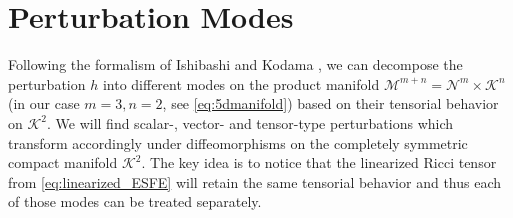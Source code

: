 \documentclass[11pt,aip,jmp,amsmath,amssymb,draft]{revtex4-1}
\begin{document}
\section{\label{sec:modes}Perturbation Modes}
Following the formalism of Ishibashi and Kodama \cite{ishibashi2011perturbations}, we can decompose the perturbation $h$ into different modes on the product manifold $\mathcal M^{m+n} = \mathcal N^m \times \mathcal K^n$ (in our case $m=3,n=2$, see \cref{eq:5dmanifold}) based on their tensorial behavior on $\mathcal K^2$. 
We will find scalar-, vector- and tensor-type perturbations which transform accordingly under diffeomorphisms on the completely symmetric compact manifold $\mathcal K^2$.
The key idea is to notice that the linearized Ricci tensor from \cref{eq:linearized_ESFE} will retain the same tensorial behavior and thus each of those modes can be treated separately. 
\end{document}
